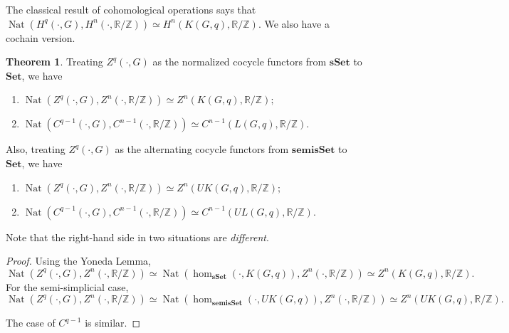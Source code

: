 \documentclass[reprint, amsmath, amssymb, showpacs, floatfix, longbibliography, aps, twocolumn, superscriptaddress, nofootinbib]{revtex4-2}
\newcommand{\ZZ}{{\mathbb Z}}
\newcommand{\RR}{{\mathbb R}}
\theoremstyle{definition}
\newtheorem{theorem}{Theorem}[section]
\begin{document}
The classical result of cohomological operations says that $\operatorname{Nat}(H^{q}(\cdot,G),H^{n}(\cdot,\RR/\ZZ))\simeq H^n(K(G,q),\RR/\ZZ)$. We also have a cochain version.
\begin{theorem}
	Treating $Z^q(\cdot,G)$ as the normalized cocycle functors from $\mathbf{sSet}$ to $\mathbf{Set}$, we have
	\begin{enumerate}
		\item $\operatorname{Nat}(Z^{q}(\cdot,G),Z^{n}(\cdot,\RR/\ZZ))\simeq Z^n(K(G,q),\RR/\ZZ);$
		\item $\operatorname{Nat}(C^{q-1}(\cdot,G),C^{n-1}(\cdot,\RR/\ZZ))\simeq C^{n-1}(L(G,q),\RR/\ZZ)$.
		
	\end{enumerate}
	Also, treating $Z^q(\cdot,G)$ as the alternating cocycle functors from $\mathbf{semisSet}$ to $\mathbf{Set}$, we have
	\begin{enumerate}
		\item $\operatorname{Nat}(Z^{q}(\cdot,G),Z^{n}(\cdot,\RR/\ZZ))\simeq Z^n(UK(G,q),\RR/\ZZ);$
		\item $\operatorname{Nat}(C^{q-1}(\cdot,G),C^{n-1}(\cdot,\RR/\ZZ))\simeq C^{n-1}(UL(G,q),\RR/\ZZ)$.
	\end{enumerate}
	Note that the right-hand side in two situations are \textit{different}. 
\end{theorem}
\begin{proof}
	Using the Yoneda Lemma,
	\begin{equation}
		\operatorname{Nat}(Z^{q}(\cdot,G),Z^{n}(\cdot,\RR/\ZZ))\simeq \operatorname{Nat}(\hom_{\mathbf{sSet}}(\cdot,K(G,q)),Z^{n}(\cdot,\RR/\ZZ))\simeq Z^{n}(K(G,q),\RR/\ZZ).
	\end{equation}
	For the semi-simplicial case,
	\begin{equation}
		\operatorname{Nat}(Z^{q}(\cdot,G),Z^{n}(\cdot,\RR/\ZZ))\simeq \operatorname{Nat}(\hom_{\mathbf{semisSet}}(\cdot,UK(G,q)),Z^{n}(\cdot,\RR/\ZZ))\simeq Z^{n}(UK(G,q),\RR/\ZZ).
	\end{equation}
	
	
	The case of $C^{q-1}$ is similar.
\end{proof}
\end{document}
